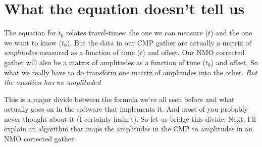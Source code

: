 \section{What the equation doesn't tell us}

The equation for $t_0$ relates travel-times: the one we can measure ($t$)
and the one we want to know ($t_0$).
But the data in our CMP gather are actually a matrix of \textit{amplitudes}
measured as a function of time ($t$) and offset.
Our NMO corrected gather will also be a matrix of amplitudes as a function of
time ($t_0$) and offset.
So what we really have to do transform one matrix of amplitudes into the other.
\textit{But the equation has no amplitudes}!

This is a major divide between the formula we've all seen before and what
actually goes on in the software that implements it.
And most of you probably never thought about it (I certainly hadn't).
So let us bridge this divide.
Next, I'll explain an algorithm that maps the amplitudes in the CMP to
amplitudes in an NMO corrected gather.
